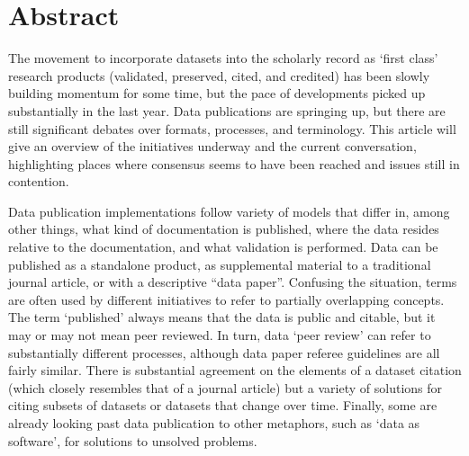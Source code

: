 \documentclass{article}
\begin{document}
\section{Abstract}\label{abstract}

The movement to incorporate datasets into the scholarly record as `first class' research products (validated, preserved, cited, and credited) has been slowly building momentum for some time, but the pace of developments picked up substantially in the last year. Data publications are springing up, but there are still significant debates over formats, processes, and terminology. This article will give an overview of the initiatives underway and the current conversation, highlighting places where consensus seems to have been reached and issues still in contention.

Data publication implementations follow variety of models that differ in, among other things, what kind of documentation is published, where the data resides relative to the documentation, and what validation is performed. Data can be published as a standalone product, as supplemental material to a traditional journal article, or with a descriptive ``data paper''. Confusing the situation, terms are often used by different initiatives to refer to partially overlapping concepts. The term `published' always means that the data is public and citable, but it may or may not mean peer reviewed. In turn, data `peer review' can refer to substantially different processes, although data paper referee guidelines are all fairly similar. There is substantial agreement on the elements of a dataset citation (which closely resembles that of a journal article) but a variety of solutions for citing subsets of datasets or datasets that change over time. Finally, some are already looking past data publication to other metaphors, such as `data as software', for solutions to unsolved problems.
\end{document}
